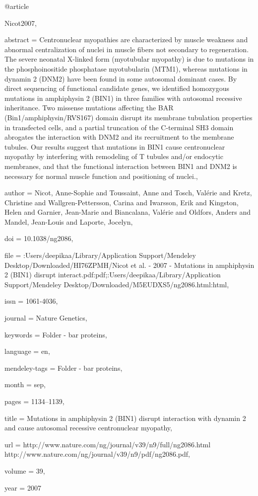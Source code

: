 @article{Nicot2007,

abstract = {Centronuclear myopathies are characterized by muscle weakness and abnormal centralization of nuclei in muscle fibers not secondary to regeneration. The severe neonatal X-linked form (myotubular myopathy) is due to mutations in the phosphoinositide phosphatase myotubularin (MTM1), whereas mutations in dynamin 2 (DNM2) have been found in some autosomal dominant cases. By direct sequencing of functional candidate genes, we identified homozygous mutations in amphiphysin 2 (BIN1) in three families with autosomal recessive inheritance. Two missense mutations affecting the BAR (Bin1/amphiphysin/RVS167) domain disrupt its membrane tubulation properties in transfected cells, and a partial truncation of the C-terminal SH3 domain abrogates the interaction with DNM2 and its recruitment to the membrane tubules. Our results suggest that mutations in BIN1 cause centronuclear myopathy by interfering with remodeling of T tubules and/or endocytic membranes, and that the functional interaction between BIN1 and DNM2 is necessary for normal muscle function and positioning of nuclei.},

author = {Nicot, Anne-Sophie and Toussaint, Anne and Tosch, Val{\'{e}}rie and Kretz, Christine and Wallgren-Pettersson, Carina and Iwarsson, Erik and Kingston, Helen and Garnier, Jean-Marie and Biancalana, Val{\'{e}}rie and Oldfors, Anders and Mandel, Jean-Louis and Laporte, Jocelyn},

doi = {10.1038/ng2086},

file = {:Users/deepikaa/Library/Application Support/Mendeley Desktop/Downloaded/HI76ZPMH/Nicot et al. - 2007 - Mutations in amphiphysin 2 (BIN1) disrupt interact.pdf:pdf;:Users/deepikaa/Library/Application Support/Mendeley Desktop/Downloaded/M5EUDXS5/ng2086.html:html},

issn = {1061-4036},

journal = {Nature Genetics},

keywords = {Folder - bar proteins},

language = {en},

mendeley-tags = {Folder - bar proteins},

month = {sep},

pages = {1134--1139},

title = {{Mutations in amphiphysin 2 (BIN1) disrupt interaction with dynamin 2 and cause autosomal recessive centronuclear myopathy}},

url = {http://www.nature.com/ng/journal/v39/n9/full/ng2086.html http://www.nature.com/ng/journal/v39/n9/pdf/ng2086.pdf},

volume = {39},

year = {2007}

}

